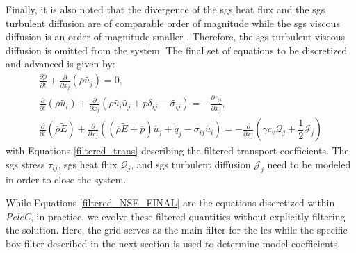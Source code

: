Finally, it is also noted that the divergence of the \gls{sgs} heat flux and the \gls{sgs} turbulent diffusion are of comparable order of magnitude while the \gls{sgs} viscous diffusion is an order of magnitude smaller \cite{LES_Comp}. Therefore, the \gls{sgs} turbulent viscous diffusion is omitted from the system. The final set of equations to be discretized and advanced is given by:  
\begin{subequations} \label{filtered_NSE_FINAL}
\begin{align}
  \frac{\partial\overline{\rho}}{\partial t} + \frac{\partial }{\partial x_j} \left( \overline{\rho}\widetilde{ u_j} \right) = 0, \label{NSE_mass_FINAL} \\
  \frac{\partial}{\partial t} \left( \overline{\rho}\widetilde{ u_i }\right) + \frac{\partial}{\partial x_j} \left(\overline{\rho}\widetilde{ u_i} \widetilde{u_j} + \overline{p }\delta_{ij} - \widetilde{\sigma_{ij}} \right) = - \frac{\partial \tau_{ij}}{\partial x_j}, \label{NSE_mom_FINAL}  \\
  \frac{\partial}{\partial t} \left( \overline{\rho}\widetilde{ E} \right) + \frac{\partial}{\partial x_j} \left(\left( \overline{\rho}\widetilde{ E}+\overline{p} \right)\widetilde{u_j} + \widetilde{q_j} - \widetilde{\sigma_{ij}}\widetilde{ u_i}\right) = - \frac{\partial}{\partial x_j } \left( \gamma c_v \mathcal{Q}_j + \dfrac{1}{2} \mathcal{J}_j \right)  \label{NSE_E_FINAL}
\end{align}
\end{subequations}
with Equations \ref{filtered_trans} describing the filtered transport coefficients. The \gls{sgs} stress $\tau_{ij}$, \gls{sgs} heat flux $\mathcal{Q}_{j}$, and \gls{sgs} turbulent diffusion $\mathcal{J}_j$ need to be modeled in order to close the system. 

While Equations \ref{filtered_NSE_FINAL} are the equations discretized within \textit{PeleC}, in practice, we evolve these filtered quantities without explicitly filtering the solution. Here, the grid serves as the main filter for the \gls{les} while the specific box filter described in the next section is used to determine model coefficients. 


